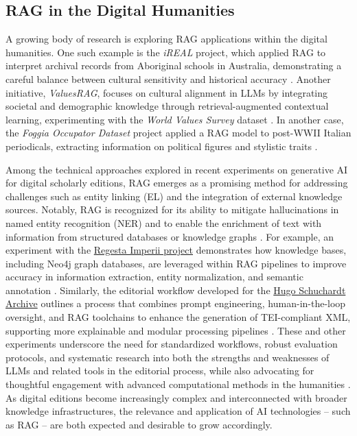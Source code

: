 \begin{spacing}{1.5}
\section{RAG in the Digital Humanities}\label{sec:rag_dh}
A growing body of research is exploring RAG applications within the digital humanities. One such example is the \textit{iREAL} project, which applied RAG to interpret archival records from Aboriginal schools in Australia, demonstrating a careful balance between cultural sensitivity and historical accuracy \citep{callaghan_prototyping_2025}. Another initiative, \textit{ValuesRAG}, focuses on cultural alignment in LLMs by integrating societal and demographic knowledge through retrieval-augmented contextual learning, experimenting with the \textit{World Values Survey} dataset \citep{seo_valuesrag_2025}. In another case, the \textit{Foggia Occupator Dataset} project applied a RAG model to post-WWII Italian periodicals, extracting information on political figures and stylistic traits \citep{ciletti_retrieval-augmented_2025}.

Among the technical approaches explored in recent experiments on generative AI for digital scholarly editions, RAG emerges as a promising method for addressing challenges such as entity linking (EL) and the integration of external knowledge sources. Notably, RAG is recognized for its ability to mitigate hallucinations in named entity recognition (NER) and to enable the enrichment of text with information from structured databases or knowledge graphs \citep{pollin_when_2025}. For example, an experiment with the \href{https://www.regesta-imperii.de/en/home.html}{Regesta Imperii project}\nocite{noauthor_home_nodate} demonstrates how knowledge bases, including Neo4j graph databases, are leveraged within RAG pipelines to improve accuracy in information extraction, entity normalization, and semantic annotation \citep{kuczera_chatgpt_2024}. Similarly, the editorial workflow developed for the \href{https://web.archive.org/web/20241120122545/https://gams.uni-graz.at/context:hsa}{Hugo Schuchardt Archive} outlines a process that combines prompt engineering, human-in-the-loop oversight, and RAG toolchains to enhance the generation of TEI-compliant XML, supporting more explainable and modular processing pipelines \citep{pollin_new_2023}. These and other experiments underscore the need for standardized workflows, robust evaluation protocols, and systematic research into both the strengths and weaknesses of LLMs and related tools in the editorial process, while also advocating for thoughtful engagement with advanced computational methods in the humanities \citep{pollin_workshop_2024}. As digital editions become increasingly complex and interconnected with broader knowledge infrastructures, the relevance and application of AI technologies -- such as RAG -- are both expected and desirable to grow accordingly.


\end{spacing}
